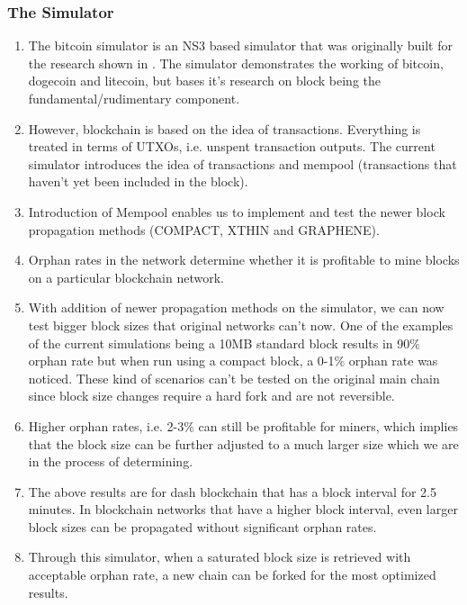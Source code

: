 \documentclass[journal,12pt,onecolumn,draftclsnofoot,]{IEEEtran}
\begin{document}
    \subsubsection{The Simulator}
    \begin{enumerate}[label=(\alph*)]
    \item 
            The bitcoin simulator is an NS3 based
            simulator that was originally built for the research shown in
            \cite{security}. The simulator demonstrates the working of bitcoin, dogecoin and
            litecoin, but bases it's research on block being the fundamental/rudimentary component. 

        \item 
            However, blockchain is based on the idea of transactions. Everything
            is treated in terms of UTXOs, i.e. unspent transaction outputs. The
            current simulator introduces the idea of transactions and mempool
            (transactions that haven't yet been included in the block). 

        \item Introduction of Mempool enables us to implement and test the newer
            block propagation methods (COMPACT, XTHIN and GRAPHENE). 

        \item Orphan rates in the network determine whether it is profitable to
            mine blocks on a particular blockchain network.

        \item With addition of newer propagation methods on the simulator, we
            can now test bigger block sizes that original networks can't now.
            One of the examples of the current simulations being a 10MB standard
            block results in 90\% orphan rate but when run using a compact block,
            a 0-1\% orphan rate was noticed. These kind of scenarios can't be
            tested on the original main chain since block size changes require a
            hard fork and are not reversible.

        \item Higher orphan rates, i.e. 2-3\% can still be profitable for miners,
            which implies that the block size can be further adjusted to a much
            larger size which we are in the process of determining. 

        \item The above results are for dash blockchain that has a block interval
            for 2.5 minutes. In blockchain networks that have a higher block
            interval, even larger block sizes can be propagated without
            significant orphan rates. 

        \item Through this simulator, when a saturated block size is retrieved
            with acceptable orphan rate, a new chain can be forked for the most
            optimized results. 

    \end{enumerate}
\end{document}
